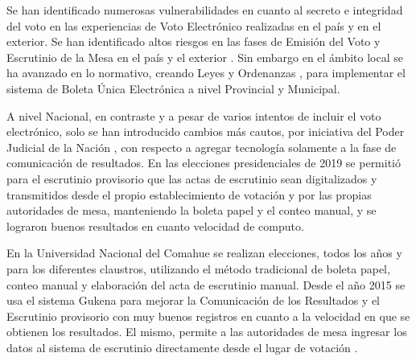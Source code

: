 \documentclass{llncs}
\begin{document}
Se han identificado numerosas vulnerabilidades en cuanto al  secreto e integridad del voto en las experiencias de Voto Electrónico realizadas en el país y en el exterior.  Se han identificado altos riesgos en las fases de Emisión del Voto y Escrutinio de la Mesa en el país \cite{amato2015vot,chaparro2016sistema,nardi2017voto} y el exterior \cite{jacobs2009electronic,aranha2014software,suiza}. Sin embargo en el ámbito local se ha avanzado en lo normativo, creando Leyes y Ordenanzas \cite{leyprovincia}\cite{ordenanzamuni}, para implementar el sistema de Boleta Única Electrónica a nivel Provincial y Municipal.  


A nivel Nacional, en contraste y a pesar de varios intentos de incluir el voto electrónico, solo se han introducido cambios más cautos, por iniciativa del Poder Judicial de la Nación  \cite{poderJudicial}, con respecto a agregar tecnología solamente a la fase de comunicación de resultados. En las elecciones presidenciales de 2019 se permitió para el escrutinio provisorio que las actas de escrutinio sean digitalizados y transmitidos desde el propio establecimiento de votación y por las propias autoridades de mesa, manteniendo la boleta papel y el conteo manual, y se lograron buenos resultados en cuanto velocidad de computo.


En la Universidad Nacional del Comahue se realizan elecciones, todos los años y para los diferentes claustros, utilizando el método tradicional de boleta papel, conteo manual y elaboración del acta de escrutinio manual. Desde el año 2015  se usa el sistema Gukena \cite{soto2018gukena} para mejorar la Comunicación de los Resultados y el Escrutinio provisorio con muy buenos registros en cuanto a la velocidad en que se obtienen los resultados.   El mismo, permite a las autoridades de mesa ingresar los datos al sistema de escrutinio directamente desde el lugar de votación  \cite{rionegro}. 



\end{document}

